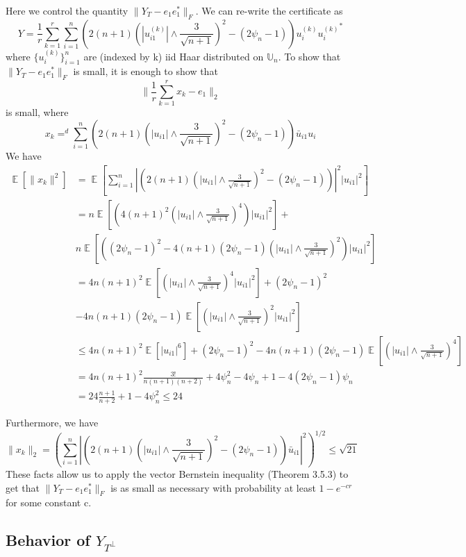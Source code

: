 \documentclass[11pt]{article}
\newcommand{\<}{\langle}
\renewcommand{\>}{\rangle}
\newcommand{\E}{\operatorname{\mathbb{E}}}
\numberwithin{equation}{section}
\newcommand{\Tp}{T^\perp}
\begin{document}
Here we control the quantity $\|Y_T - e_1e_1^*\|_F$. We can re-write the certificate as 
\[
Y =\frac{1}{r} \sum_{k=1}^{r} \sum_{i=1}^{n} (2(n+1)(|u_{i1}^{(k)}|\wedge\frac{3}{\sqrt{n+1}} )^2  - (2\psi_n -1))u_i^{(k)} {u_{i}^{(k)}}^*
\]
where $\{u_i^{(k)}\}_{i=1}^n$ are (indexed by k)  iid Haar distributed on $\mathbb{U}_n$. To show that $\|Y_{T}-e_1 e_1^*\|_{F}$ is small, it is enough to show that
\[
\|\frac{1}{r} \sum_{k=1}^{r} x_k - e_1\|_2
\]
is small, where
\[
x_k =^d \sum_{i=1}^n(2(n+1)(|u_{i1}|\wedge\frac{3}{\sqrt{n+1}} )^2  - (2\psi_n -1)) \bar{u}_{i1} u_i
\]
We have 
\begin{align*}
\E\left[ \|x_k\|^2\right] &= \E\left[ \sum_{i=1}^{n}\left| (2(n+1)(|u_{i1}|\wedge\frac{3}{\sqrt{n+1}} )^2  - (2\psi_n -1))\right|^2 |u_{i1}|^2 \right]\\
&= n\E\left[ \left(4(n+1)^2\left(|u_{i1}|\wedge \frac{3}{\sqrt{n+1}} \right)^4\right)|u_{i1}|^2\right] +\\
& n\E\left[ \left((2\psi_n -1)^2 - 4(n+1)(2\psi_n-1) \left(|u_{i1}|\wedge \frac{3}{\sqrt{n+1}} \right)^2\right)|u_{i1}|^2 \right]\\
&= 4n(n+1)^2\E\left[\left(|u_{i1}|\wedge \frac{3}{\sqrt{n+1}} \right)^4|u_{i1}|^2  \right] + (2\psi_n-1)^2\\
& - 4n(n+1)(2\psi_n-1)\E\left[\left(|u_{i1}|\wedge \frac{3}{\sqrt{n+1}} \right)^2|u_{i1}|^2  \right] \\
&\leq 4n(n+1)^2 \E\left[ |u_{i1}|^6 \right] + (2\psi_n-1)^2 - 4n(n+1)(2\psi_n-1)\E\left[ \left( |u_{i1}|\wedge \frac{3}{\sqrt{n+1}} \right)^4 \right]\\
&=4n(n+1)^2\frac{3!}{n(n+1)(n+2)} + 4\psi_n^2 - 4\psi_n + 1 - 4(2\psi_n-1)\psi_n\\
&= 24\frac{n+1}{n+2} + 1-4\psi_n^2 \leq 24
\end{align*}

Furthermore, we have
\[
\|x_k\|_2 = \left( \sum_{i=1}^n |(2(n+1)(|u_{i1}|\wedge\frac{3}{\sqrt{n+1}} )^2  - (2\psi_n -1)) \bar{u}_{i1}|^2  \right)^{1/2} \leq \sqrt{21}
\]
These facts allow us to apply the vector Bernstein inequality (Theorem 3.5.3) to get that $\|Y_{T}-e_1 e_1^*\|_{F}$ is as small as necessary with probability at least $1- e^{-cr}$ for some constant c. \\

\subsection{Behavior of $Y_{\Tp}$}
\end{document}
